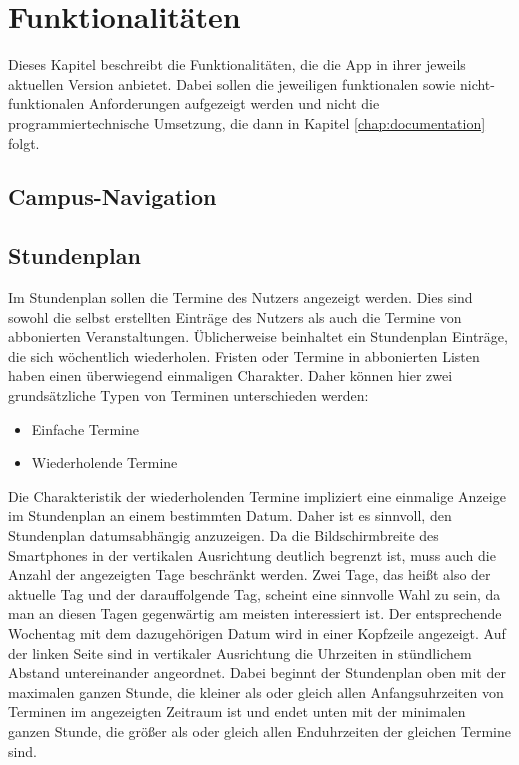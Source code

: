 \documentclass[noindent]{tudreport}
\begin{document}
	\chapter{Funktionalitäten}\label{chap:functionalities}
		Dieses Kapitel beschreibt die Funktionalitäten, die die App in ihrer jeweils aktuellen Version anbietet. Dabei sollen die jeweiligen funktionalen sowie nicht-funktionalen Anforderungen aufgezeigt werden und nicht die programmiertechnische Umsetzung, die dann in Kapitel \ref{chap:documentation} folgt.
		
		\section{Campus-Navigation}\label{sec:campus_navigation}
		
		\section{Stundenplan}\label{sec:timetable}
			Im Stundenplan sollen die Termine des Nutzers angezeigt werden. Dies sind sowohl die selbst erstellten Einträge des Nutzers als auch die Termine von abbonierten Veranstaltungen. Üblicherweise beinhaltet ein Stundenplan Einträge, die sich wöchentlich wiederholen. Fristen oder Termine in abbonierten Listen haben einen überwiegend einmaligen Charakter. Daher können hier zwei grundsätzliche Typen von Terminen unterschieden werden:
			\begin{itemize}
				\item Einfache Termine
				
				\item Wiederholende Termine
			\end{itemize}
			Die Charakteristik der wiederholenden Termine impliziert eine einmalige Anzeige im Stundenplan an einem bestimmten Datum. Daher ist es sinnvoll, den Stundenplan datumsabhängig anzuzeigen. Da die Bildschirmbreite des Smartphones in der vertikalen Ausrichtung deutlich begrenzt ist, muss auch die Anzahl der angezeigten Tage beschränkt werden. Zwei Tage, das heißt also der aktuelle Tag und der darauffolgende Tag, scheint eine sinnvolle Wahl zu sein, da man an diesen Tagen gegenwärtig am meisten interessiert ist. Der entsprechende Wochentag mit dem dazugehörigen Datum wird in einer Kopfzeile angezeigt. Auf der linken Seite sind in vertikaler Ausrichtung die Uhrzeiten in stündlichem Abstand untereinander angeordnet. Dabei beginnt der Stundenplan oben mit der maximalen ganzen Stunde, die kleiner als oder gleich allen Anfangsuhrzeiten von Terminen im angezeigten Zeitraum ist und endet unten mit der minimalen ganzen Stunde, die größer als oder gleich allen Enduhrzeiten der gleichen Termine sind.
		
\end{document}
